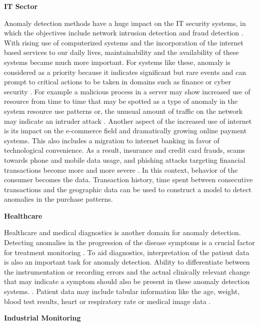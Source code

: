 \textbf{ IT Sector}

Anomaly detection methods have a huge impact on the IT security systems, in which the objectives
include network intrusion detection and fraud detection \cite{Pimentel:2014:RRN:2588908.2589196}.
With rising use of computerized systems and the incorporation of the internet based services to
our daily lives, maintainability and the availability of these systems became much more important.
For systems like these, anomaly is considered as a priority because it indicates significant but
rare events and can prompt to critical actions to be taken in domains such as finance or cyber security
\cite{AHMED201619}. For example a malicious process in a server may show increased use of resource
from time to time that may be spotted as a type of anomaly in the system resource use patterns or,
the unusual amount of traffic on the network may indicate an intruder attack \cite{FERNANDES20161}
\cite{JABEZ2015338}. Another aspect of the increased use of internet is its impact on the e-commerce
field and dramatically growing online payment systems. This also includes a migration to internet
banking in favor of technological convenience. As a result, insurance and credit card frauds,
scams towards phone and mobile data usage, and phishing attacks targeting financial transactions
become more and more severe \cite{finance_anomaly}. In this context, behavior of the consumer
becomes the data. Transaction history, time spent between consecutive transactions and the
geographic data can be used to construct a model to detect anomalies in the purchase patterns.

\textbf{ Healthcare}

Healthcare and medical diagnostics is another domain for anomaly detection. Detecting anomalies in
the progression of the disease symptoms is a crucial factor for treatment monitoring
\cite{Schlegl2017UnsupervisedAD}. To aid diagnostics, interpretation of the patient data is also an
important task for anomaly detection. Ability to differentiate between the instrumentation or
recording errors and the actual clinically relevant change that may indicate a symptom should also
be present in these anomaly detection systems. \cite{Pimentel:2014:RRN:2588908.2589196}. Patient
data may include tabular information like the age, weight, blood test results, heart or
respiratory rate \cite{inproceedings_medical}\cite{Markou:2003:NDR:959414.959416} or medical image data
\cite{Schlegl2017UnsupervisedAD}. 

\textbf{ Industrial Monitoring}

